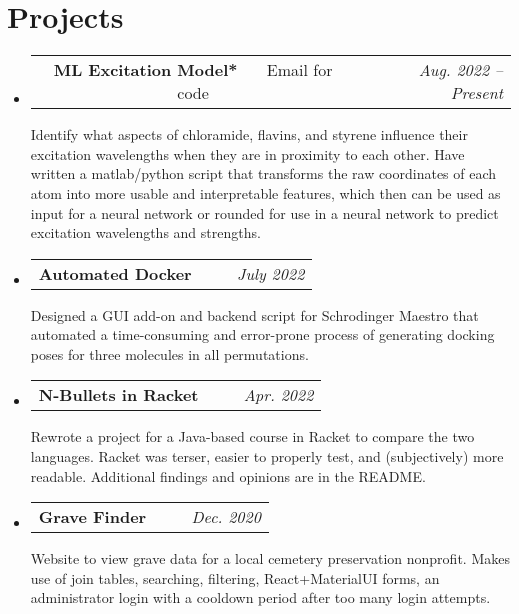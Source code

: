\documentclass[letterpaper,11pt]{article}
\makeatletter
\newcommand{\resumeSubheading}[5]{
  \vspace{-1pt}\item
    \begin{tabular*}{0.97\textwidth}[t]{c@{\extracolsep{\fill}} r }
      \small\textbf{#1} \headingcap{#3} \ \ \ #2 &  \raggedleft\textit{\small #4} 
    \end{tabular*}
    \small#5
}
\newcommand{\resumeSubHeadingListStart}{\begin{itemize}[leftmargin=*]}
\newcommand{\resumeSubHeadingListEnd}{\end{itemize}}
\makeatother
\begin{document}
  \section{Projects\small{}}
  \resumeSubHeadingListStart
  \resumeSubheading{ML Excitation Model*}{Email for code}{Python, Maestro, MATLAB, Bash, TensorFlow}{Aug. 2022 -- Present}{Identify what aspects of chloramide, flavins, and styrene influence their excitation wavelengths when they are in proximity to each other. Have written a matlab/python script that transforms the raw coordinates of each atom into more usable and interpretable features, which then can be used as input for a neural network or rounded for use in a neural network to predict excitation wavelengths and strengths. }
  \resumeSubheading{Automated Docker}{\ghlink{automated\_docking\_script}}{Python, Maestro, Slurm, QtPy}{July 2022}{Designed a GUI add-on and backend script for Schrodinger Maestro that automated a time-consuming and error-prone process of generating docking poses for three molecules in all permutations.}
  \resumeSubheading{N-Bullets in Racket}{\ghlink{nbulletsrkt}}{Racket}{Apr. 2022}
  {Rewrote a project for a Java-based course in Racket to compare the two languages. Racket was terser, easier to properly test, and (subjectively) more readable. Additional findings and opinions are in the README.}
  \resumeSubheading{Grave Finder}{\ghlink{findagravemiddleborough.ml}}{ReactJS, PHP, MySQL, Cloudflare, cPanel, SSL}{Dec. 2020}{Website to view grave data for a local cemetery preservation nonprofit. Makes use of join tables, searching, filtering, React+MaterialUI forms, an administrator login with a cooldown period after too many login attempts. }
  \resumeSubHeadingListEnd
\end{document}
